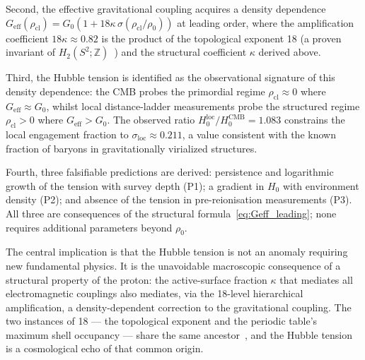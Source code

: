 \documentclass[11pt,a4paper]{article}
\theoremstyle{definition}
\newcommand{\Geff}{G_{\mathrm{eff}}}
\newcommand{\Gzero}{G_0}
\newcommand{\kap}{\kappa}
\newcommand{\sig}{\sigma}
\newcommand{\rhocl}{\rho_{\mathrm{cl}}}
\newcommand{\rhoO}{\rho_0}
\newcommand{\Hzero}{H_0}
\newcommand{\HCMB}{H_0^{\mathrm{CMB}}}
\newcommand{\Hloc}{H_0^{\mathrm{loc}}}
\begin{document}
Second, the effective gravitational coupling acquires a density dependence $\Geff(\rhocl) = \Gzero(1+18\kap\,\sig(\rhocl/\rhoO))$ at leading order, where the amplification coefficient $18\kap \approx 0.82$ is the product of the topological exponent 18 (a proven invariant of $H_2(S^2;\mathbb{Z})$~\cite{Topology_18_PDL_2026}) and the structural coefficient $\kap$ derived above.

Third, the Hubble tension is identified as the observational signature of this density dependence: the CMB probes the primordial regime $\rhocl \approx 0$ where $\Geff \approx \Gzero$, whilst local distance-ladder measurements probe the structured regime $\rhocl > 0$ where $\Geff > \Gzero$. The observed ratio $\Hloc/\HCMB = 1.083$ constrains the local engagement fraction to $\sig_{\mathrm{loc}} \approx 0.211$, a value consistent with the known fraction of baryons in gravitationally virialized structures.

Fourth, three falsifiable predictions are derived: persistence and logarithmic growth of the tension with survey depth (P1); a gradient in $\Hzero$ with environment density (P2); and absence of the tension in pre-reionisation measurements (P3). All three are consequences of the structural formula~\eqref{eq:Geff_leading}; none requires additional parameters beyond $\rhoO$.

The central implication is that the Hubble tension is not an anomaly requiring new fundamental physics. It is the unavoidable macroscopic consequence of a structural property of the proton: the active-surface fraction $\kap$ that mediates all electromagnetic couplings also mediates, via the 18-level hierarchical amplification, a density-dependent correction to the gravitational coupling. The two instances of 18 --- the topological exponent and the periodic table's maximum shell occupancy --- share the same ancestor~\cite{Topology_18_PDL_2026}, and the Hubble tension is a cosmological echo of that common origin.



\end{document}

